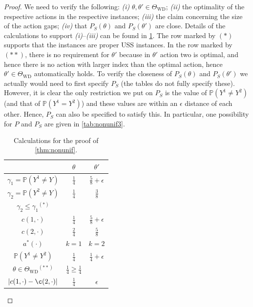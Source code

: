 \documentclass[11pt]{article} %
\newcommand{\WD}{\mathrm{WD}}
\newcommand{\TWD}{\Theta_{\WD}}
\newcommand{\Prob}[1]{\mathbb{P}\left(#1\right)}
\begin{document}
\begin{proof}
We need to verify the following:
{\em (i)} $\theta,\theta'\in \TWD$;
{\em (ii)} the optimality of the respective actions in the respective instances;
{\em (iii)} the claim concerning the size of the action gaps;
{\em (iv)} that $P_S(\theta)$ and $P_S(\theta')$ are close.
Details of the calculations to support {\em (i)}--{\em (iii)} can be found in \cref{tab:nonunif2}.
The row marked by $(*)$ supports that the instances are proper USS instances.
In the row marked by $(**)$, there is no requirement for $\theta'$ because 
in $\theta'$ action two is optimal, and hence there is no action with larger index 
than the optimal action, hence $\theta'\in \TWD$ automatically holds.
To verify the closeness of $P_S(\theta)$ and $P_S(\theta')$ we actually 
would need to first specify $P_S$ (the tables do not fully specify these).
However, it is clear the only restriction we put on $P_S$ is the value of $\Prob{Y^1\ne Y^2}$ (and
that of $\Prob{Y^1=Y^2}$) and these values are within an $\epsilon$ distance of each other.
Hence, $P_S$ can also be specified to satisfy this. In particular, one possibility for $P$ and $P_S$ are given in \cref{tab:nonunif3}.
\bgroup
\def\arraystretch{1.5}
\begin{table}[]
	\centering
	\begin{tabular}{|c|c|c|}
		\hline
		& $\theta$                & $\theta'$ \\ \hline
		$\gamma_1 = \Prob{Y^1\ne Y}$ & $\frac{1}{4}$           & $\frac{5}{8}+\epsilon$ \\ \hline
		$\gamma_2 = \Prob{Y^2\ne Y}$ & $\frac{1}{4}$           & $\frac{3}{8}$ \\ \hline
		$\gamma_2 \le \gamma_1 \mbox{}^{(*)}$        & \checkmark           & \checkmark \\ \hline
		$c(1,\cdot)$                                 & $\frac{1}{4}$           & $\frac{5}{8}+\epsilon$ \\ \hline
		$c(2,\cdot)$                                 & $\frac{2}{4}$           & $\frac{5}{8}$ \\ \hline
		$a^*(\cdot)$                                 & $k=1$                   & $k=2$ \\ \hline
		$\Prob{Y^1\ne Y^2}$                   & $\frac{1}{4}$         & $\frac{1}{4}+\epsilon$ \\ \hline
		$\theta \in \TWD  \mbox{}^{(**)}$                        & $\frac{1}{4}\ge \frac14$ \checkmark & \checkmark \\ \hline
		$|c(1,\cdot)-\c(2,\cdot)|$              & $\frac{1}{4}$         & $\epsilon$ \\ \hline
	\end{tabular}
	\vspace*{0.1in}
	\caption{Calculations for the proof of \cref{thm:nonunif}.}
	\label{tab:nonunif2}
\end{table}
\egroup


\end{proof}
\end{document}
